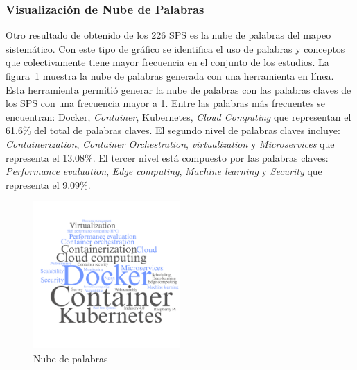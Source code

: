 \subsubsection{Visualización de Nube de Palabras}
Otro resultado de obtenido de los 226 SPS es la nube de palabras del mapeo sistemático. Con este tipo de gráfico se identifica el uso de palabras y conceptos que colectivamente tiene mayor frecuencia en el conjunto de los estudios. La figura~\ref{fig:SPS-wordcloud} muestra la nube de palabras generada con una herramienta en línea. Esta herramienta permitió generar la nube de palabras con las palabras claves de los SPS con una frecuencia mayor a 1.
Entre las palabras más frecuentes se encuentran: Docker, \textit{Container}, Kubernetes, \textit{Cloud Computing} que representan el 61.6\% del total de palabras claves. El segundo nivel de palabras claves incluye: \textit{Containerization}, \textit{Container Orchestration}, \textit{virtualization} y \textit{Microservices} que representa el 13.08\%. El tercer nivel está compuesto por las palabras claves: \textit{Performance evaluation}, \textit{Edge computing}, \textit{Machine learning} y \textit{Security} que representa el 9.09\%.
\begin{figure}[htbp]
    \centering
    \includegraphics[width=0.5\textwidth]{resources/images/resultados/wordcloud.png}
    \caption{Nube de palabras}\label{fig:SPS-wordcloud}
\end{figure}
\mbox{}\\